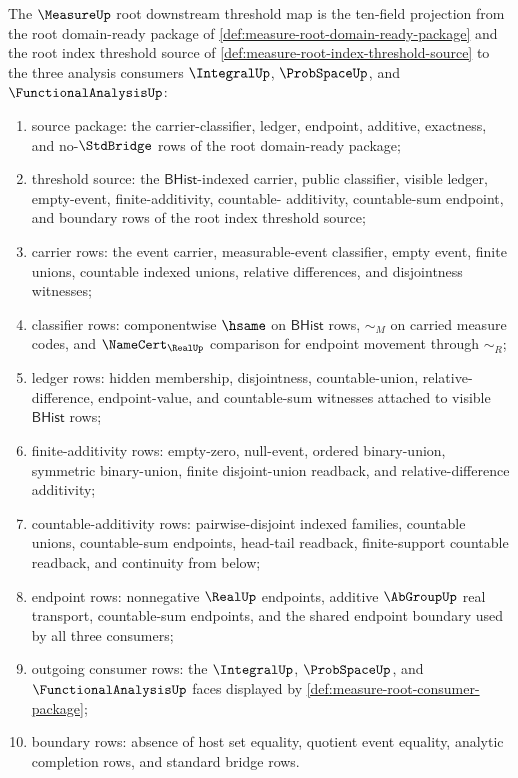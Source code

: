 \begin{definition}
\label{def:measure-root-downstream-threshold-map}
The $\MeasureUp$ root downstream threshold map is the ten-field projection
from the root domain-ready package of
\autoref{def:measure-root-domain-ready-package} and the root index threshold
source of \autoref{def:measure-root-index-threshold-source} to the three
analysis consumers $\IntegralUp$, $\ProbSpaceUp$, and
$\FunctionalAnalysisUp$:
\begin{enumerate}
  \item source package: the carrier-classifier, ledger, endpoint, additive,
  exactness, and no-$\StdBridge$ rows of the root domain-ready package;
  \item threshold source: the $\mathsf{BHist}$-indexed carrier, public
  classifier, visible ledger, empty-event, finite-additivity, countable-
  additivity, countable-sum endpoint, and boundary rows of the root index
  threshold source;
  \item carrier rows: the event carrier, measurable-event classifier, empty
  event, finite unions, countable indexed unions, relative differences, and
  disjointness witnesses;
  \item classifier rows: componentwise $\hsame$ on $\mathsf{BHist}$ rows,
  $\sim_M$ on carried measure codes, and $\NameCert_{\RealUp}$ comparison for
  endpoint movement through $\sim_R$;
  \item ledger rows: hidden membership, disjointness, countable-union,
  relative-difference, endpoint-value, and countable-sum witnesses attached to
  visible $\mathsf{BHist}$ rows;
  \item finite-additivity rows: empty-zero, null-event, ordered binary-union,
  symmetric binary-union, finite disjoint-union readback, and
  relative-difference additivity;
  \item countable-additivity rows: pairwise-disjoint indexed families,
  countable unions, countable-sum endpoints, head-tail readback,
  finite-support countable readback, and continuity from below;
  \item endpoint rows: nonnegative $\RealUp$ endpoints, additive
  $\AbGroupUp$ real transport, countable-sum endpoints, and the shared
  endpoint boundary used by all three consumers;
  \item outgoing consumer rows: the $\IntegralUp$, $\ProbSpaceUp$, and
  $\FunctionalAnalysisUp$ faces displayed by
  \autoref{def:measure-root-consumer-package};
  \item boundary rows: absence of host set equality, quotient event equality,
  analytic completion rows, and standard bridge rows.
\end{enumerate}
\end{definition}

